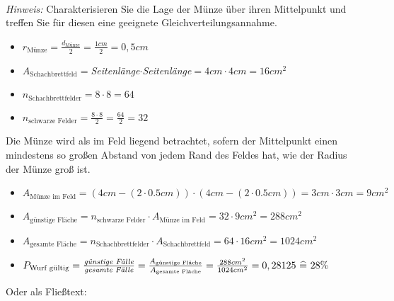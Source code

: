 \documentclass[twoside]{article}
\begin{document}
		\\
		\textit{Hinweis:} Charakterisieren Sie die Lage der Münze über ihren Mittelpunkt und treffen Sie für diesen eine geeignete Gleichverteilungsannahme.
		\begin{itemize}
	        \item $r_{\text{Münze}} = \frac{d_{\text{Münze}}}{2}=\frac{1cm}{2}=0,5cm$
	        \item $A_{\text{Schachbrettfeld}} = $\textit{Seitenlänge}$ \cdot$\textit{Seitenlänge}$ =4cm \cdot 4cm=16cm^2$
	        \item $n_{\text{Schachbrettfelder}} = 8\cdot8=64$
	        \item $n_{\text{schwarze Felder}} = \frac{8\cdot8}{2}=\frac{64}{2}=32$
	    \end{itemize}
	    Die Münze wird als im Feld liegend betrachtet, sofern der Mittelpunkt einen mindestens so großen Abstand von jedem Rand des Feldes hat, wie der Radius der Münze groß ist.
	    \begin{itemize}
	        \item $A_{\text{Münze im Feld}} = (4cm-(2\cdot 0.5cm)) \cdot (4cm-(2\cdot 0.5cm)) = 3cm\cdot3cm = 9cm^2$
	        \item $A_{\text{günstige Fläche}} = n_{\text{schwarze Felder}} \cdot A_{\text{Münze im Feld}} = 32 \cdot 9cm^2 =288cm^2$
	        \item $A_{\text{gesamte Fläche}} = n_{\text{Schachbrettfelder}} \cdot A_{\text{Schachbrettfeld}} = 64 \cdot 16cm^2 =1024cm^2$
	        \item $P_{\text{Wurf gültig}} = \frac{\text{\textit{günstige Fälle}}}{\text{\textit{gesamte Fälle}}} = \frac{A_{\text{günstige Fläche}}}{A_{\text{gesamte Fläche}}} = \frac{288cm^2}{1024cm^2} = 0,28125 ~\widehat{=}~ 28\%$
	    \end{itemize}
    Oder als Fließtext:		
\end{document}
